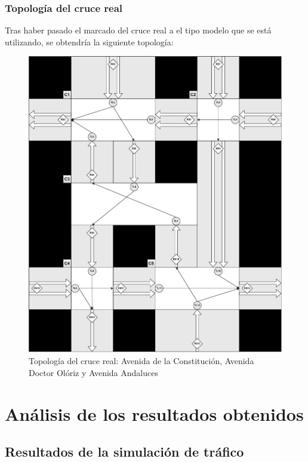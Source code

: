 \subsection{Topología del cruce real}
Tras haber pasado el marcado del cruce real a el tipo modelo que se está utilizando, se obtendría la siguiente topología:
\begin{figure}[H]
    \centering
    \includegraphics[width=1\linewidth]{text/image/DCruc-CReal-Topologia.pdf}
    \caption{Topología del cruce real: Avenida de la Constitución, Avenida Doctor Olóriz y Avenida Andaluces}
    \label{fig:cruce_real_topologia}
\end{figure}



\chapter{Análisis de los resultados obtenidos}
    \label{chap:seven}
    
\section{Resultados de la simulación de tráfico}
    \label{section:resultados}
    
